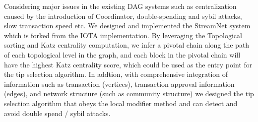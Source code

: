Considering major issues in the existing DAG systems such as centralization caused by the introduction of Coordinator, double-spending and sybil attacks, slow transaction speed etc. 
We designed and implemented the StreamNet system which is forked from the IOTA implementation.
By leveraging the Topological sorting and Katz centrality computation, we infer a pivotal chain along the path of each topological level in the graph,
and each block in the pivotal chain will have the highest Katz centrality score, which could be used as the entry point for the tip selection algorithm.
In addtion, with comprehensive integration of information such as transaction (vertices), 
transaction approval information (edges), and network structure (such as community structure) we designed the tip selection algorithm that obeys the local modifier method and can detect and avoid double spend / sybil attacks.

